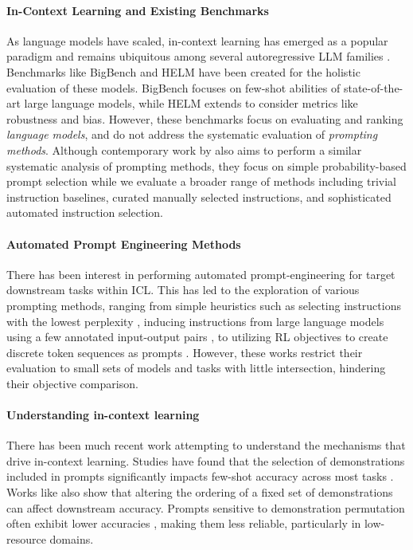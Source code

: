 \paragraph{In-Context Learning and Existing Benchmarks} As language models have scaled, in-context learning has emerged as a popular paradigm and remains ubiquitous among several autoregressive LLM families \cite{brown2020language, llama, bloom, gptneo, opt}. Benchmarks like BigBench \cite{bigbench} and HELM \cite{helm} have been created for the holistic evaluation of these models. BigBench focuses on few-shot abilities of state-of-the-art large language models, while HELM extends to consider metrics like robustness and bias. However, these benchmarks focus on evaluating and ranking \emph{language models}, and do not address the systematic evaluation of \emph{prompting methods}. Although contemporary work by \citet{yang2023improving} also aims to perform a similar systematic analysis of prompting methods, they focus on simple probability-based prompt selection while we evaluate a broader range of methods including trivial instruction baselines, curated manually selected instructions, and sophisticated automated instruction selection.

\paragraph{Automated Prompt Engineering Methods} There has been interest in performing automated prompt-engineering for target downstream tasks within ICL. This has led to the exploration of various prompting methods, ranging from simple heuristics such as selecting instructions with the lowest perplexity \cite{lowperplexityprompts}, inducing instructions from large language models using a few annotated input-output pairs \cite{ape}, to utilizing RL objectives to create discrete token sequences as prompts \cite{rlprompt}. However, these works restrict their evaluation to small sets of models and tasks with little intersection, hindering their objective comparison. %

\paragraph{Understanding in-context learning} There has been much recent work attempting to understand the mechanisms that drive in-context learning. Studies have found that the selection of demonstrations included in prompts significantly impacts few-shot accuracy across most tasks \cite{whatmakesgoodicexamples, selectionmachinetranslation, knnprompting}. Works like \cite{fantasticallyorderedprompts} also show that altering the ordering of a fixed set of demonstrations can affect downstream accuracy. Prompts sensitive to demonstration permutation often exhibit lower accuracies \cite{relationsensitivityaccuracy}, making them less reliable, particularly in low-resource domains.

